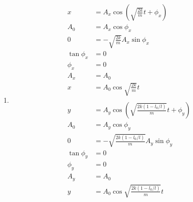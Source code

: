 \documentclass{article}
\begin{document}
\begin{enumerate}
  \item

        \begin{align*}
          x           & = A_x \cos \left( \sqrt{\frac{2 k}{m}} t + \phi_x \right)               \\
          A_0         & = A_x \cos \phi_x                                                       \\
          0           & = -\sqrt{\frac{2 k}{m}} A_x \sin \phi_x                                 \\
          \tan \phi_x & = 0                                                                     \\
          \phi_x      & = 0                                                                     \\
          A_x         & = A_0                                                                   \\
          x           & = A_0 \cos \sqrt{\frac{2 k}{m}} t                                       \\ \\
          y           & = A_y \cos \left( \sqrt{\frac{2 k (1 - l_0 / l)}{m}} t + \phi_y \right) \\
          A_0         & = A_y \cos \phi_y                                                       \\
          0           & = -\sqrt{\frac{2 k (1 - l_0 / l)}{m}} A_y \sin \phi_y                   \\
          \tan \phi_y & = 0                                                                     \\
          \phi_y      & = 0                                                                     \\
          A_y         & = A_0                                                                   \\
          y           & = A_0 \cos \sqrt{\frac{2 k (1 - l_0 / l)}{m}} t
        \end{align*}
\end{enumerate}
\end{document}
